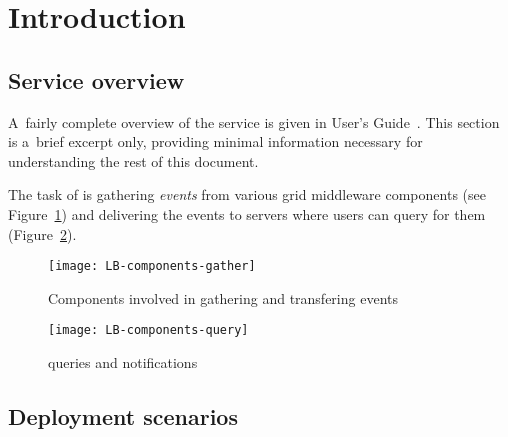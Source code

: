 %
%
\section{Introduction}

\subsection{Service overview}

A~fairly complete overview of the \LB service is given in \LB User's Guide~\cite{lbug}.
This section is a~brief excerpt only, providing minimal information necessary for
understanding the rest of this document.

The task of \LB is gathering \emph{\LB events} from various grid middleware components
(see Figure~\ref{f:comp-gather})
and delivering the events to \LB servers where users can query for them
(Figure~\ref{f:comp-query}).

\begin{figure}[ht]
\centering
\texttt{[image: LB-components-gather]}
\caption{Components involved in gathering and transfering \LB events}
\label{f:comp-gather}
\end{figure}

\begin{figure}[ht]
\centering
\texttt{[image: LB-components-query]}
\caption{\LB queries and notifications}
\label{f:comp-query}
\end{figure}




\subsection{Deployment scenarios}

